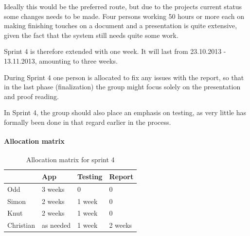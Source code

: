 \documentclass[11pt]{book}
\begin{document}
Ideally this would be the preferred route, but due to the projects current status some changes needs to be made. Four persons working 50 hours or more each on making finishing touches on a document and a presentation is quite extensive, given the fact that the system still needs quite some work.

Sprint 4 is therefore extended with one week. It will last from 23.10.2013 - 13.11.2013, amounting to three weeks.

During Sprint 4 one person is allocated to fix any issues with the report, so that in the last phase (finalization) the group might focus solely on the presentation and proof reading.

In Sprint 4, the group should also place an emphasis on testing, as very little has formally been done in that regard earlier in the process.

\paragraph{Allocation matrix}
\begin{table}[H]
    \centering
    \begin{tabular}{| l | l | l | l |} \hline
         & App & Testing & Report\\
         \hline
         Odd & 3 weeks & 0 & 0\\
         \hline
         Simon & 2 weeks & 1 week & 0\\
         \hline
         Knut & 2 weeks & 1 week & 0\\
         \hline
         Christian & as needed & 1 week & 2 weeks\\
         \hline
    \end{tabular}
    \caption{Allocation matrix for sprint 4}
    \label{tab:phase_sprint4_allocation}
\end{table}
\end{document}
